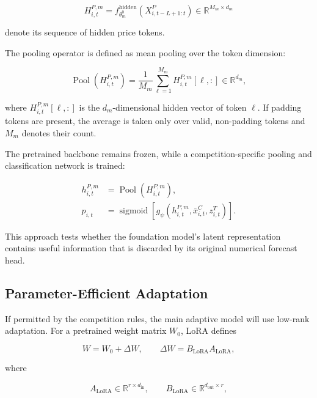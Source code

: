 \documentclass[11pt]{article}
\newcommand{\R}{\mathbb{R}}
\newcommand{\sigmoid}{\operatorname{sigmoid}}
\begin{document}
\begin{equation}
H^{P,m}_{i,t}
=
f^{\mathrm{hidden}}_{\theta_m^0}
\left(
X^P_{i,t-L+1:t}
\right)
\in
\R^{M_m \times d_m}
\end{equation}

denote its sequence of hidden price tokens.

The pooling operator is defined as mean pooling over the token dimension:

\begin{equation}
\operatorname{Pool}
\left(
H^{P,m}_{i,t}
\right)
=
\frac{1}{M_m}
\sum_{\ell=1}^{M_m}
H^{P,m}_{i,t}[\ell,:]
\in
\R^{d_m},
\end{equation}

where $H^{P,m}_{i,t}[\ell,:]$ is the $d_m$-dimensional hidden vector of
token $\ell$. If padding tokens are present, the average is taken only over
valid, non-padding tokens and $M_m$ denotes their count.

The pretrained backbone remains frozen, while a competition-specific pooling
and classification network is trained:

\begin{align}
h^{P,m}_{i,t}
&=
\operatorname{Pool}
\left(
H^{P,m}_{i,t}
\right),\\
p_{i,t}
&=
\sigmoid
\left[
g_\psi
\left(
h^{P,m}_{i,t},
\bar x^C_{i,t},
z^T_{i,t}
\right)
\right].
\end{align}

This approach tests whether the foundation model's latent representation
contains useful information that is discarded by its original numerical
forecast head.

\subsection{Parameter-Efficient Adaptation}

If permitted by the competition rules, the main adaptive model will use
low-rank adaptation. For a pretrained weight matrix $W_0$, LoRA defines

\begin{equation}
W
=
W_0 + \Delta W,
\qquad
\Delta W = B_{\mathrm{LoRA}}A_{\mathrm{LoRA}},
\end{equation}

where

\begin{equation}
A_{\mathrm{LoRA}}\in\R^{r\times d_{\mathrm{in}}},
\qquad
B_{\mathrm{LoRA}}\in\R^{d_{\mathrm{out}}\times r},
\end{equation}
\end{document}
